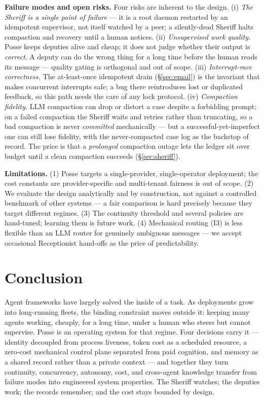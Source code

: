 \documentclass[10pt,twocolumn]{article}
\begin{document}
\noindent\textbf{Failure modes and open risks.} Four risks are inherent to the design.
(i) \emph{The Sheriff is a single point of failure} --- it is a root daemon restarted by
an idempotent supervisor, not itself watched by a peer; a silently-dead Sheriff halts
compaction and recovery until a human notices. (ii) \emph{Unsupervised work quality.}
Posse keeps deputies alive and cheap; it does not judge whether their output is
\emph{correct}. A deputy can do the wrong thing for a long time before the human reads
its message --- quality gating is orthogonal and out of scope. (iii)
\emph{Interrupt-race correctness.} The at-least-once idempotent drain (\S\ref{sec:email})
is the invariant that makes concurrent interrupts safe; a bug there reintroduces lost or
duplicated feedback, so this path needs the care of any lock protocol. (iv)
\emph{Compaction fidelity.} LLM compaction can drop or distort a case despite a
forbidding prompt; on a failed compaction the Sheriff waits and retries rather than
truncating, so a bad compaction is never \emph{committed} mechanically --- but a
successful-yet-imperfect one can still lose fidelity, with the never-compacted case log
as the backstop of record. The price is that a \emph{prolonged} compaction outage lets
the ledger sit over budget until a clean compaction succeeds (\S\ref{sec:sheriff}).

\noindent\textbf{Limitations.} (1) Posse targets a single-provider, single-operator
deployment; the cost constants are provider-specific and multi-tenant fairness is out of
scope. (2) We evaluate the design analytically and by construction, not against a
controlled benchmark of other systems --- a fair comparison is hard precisely because
they target different regimes. (3) The continuity threshold and several policies are
hand-tuned; learning them is future work. (4) Mechanical routing (I3) is less flexible
than an LLM router for genuinely ambiguous messages --- we accept occasional Receptionist
hand-offs as the price of predictability.

\section{Conclusion}
Agent frameworks have largely solved the inside of a task. As deployments grow into
long-running fleets, the binding constraint moves outside it: keeping many agents
working, cheaply, for a long time, under a human who steers but cannot supervise. Posse
is an operating system for that regime. Four decisions carry it --- identity decoupled
from process liveness, token cost as a scheduled resource, a zero-cost mechanical
control plane separated from paid cognition, and memory as a shared record rather than a
private context --- and together they turn continuity, concurrency, autonomy, cost, and
cross-agent knowledge transfer from failure modes into engineered system properties.
The Sheriff watches; the deputies work; the records remember; and the cost stays bounded
by design.
\end{document}
